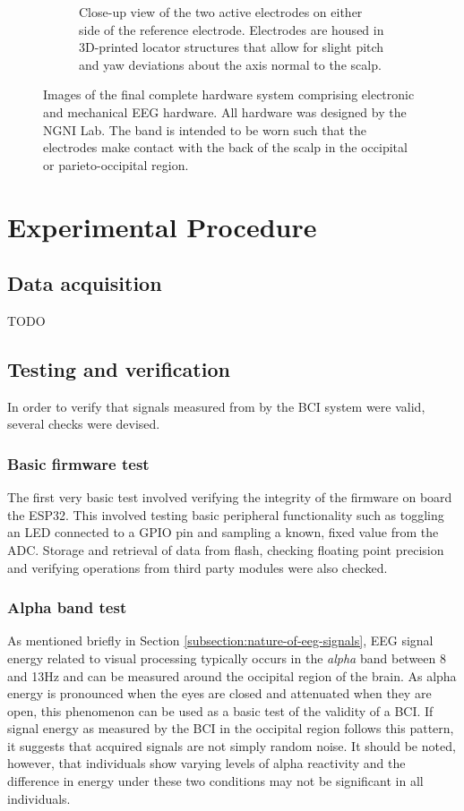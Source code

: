 \begin{figure}
\begin{subfigure}[c]{0.48\textwidth}
         \caption{Close-up view of the two active electrodes on either side of the reference electrode. Electrodes are housed in 3D-printed locator structures that allow for slight pitch and yaw deviations about the axis normal to the scalp.}
         \label{fig:final-headband-electrodes}
     \end{subfigure}
        \caption{Images of the final complete hardware system comprising electronic and mechanical EEG hardware. All hardware was designed by the NGNI Lab. The band is intended to be worn such that the electrodes make contact with the back of the scalp in the occipital or parieto-occipital region.}
        \label{fig:final-headband-subfigs}
\end{figure}

\section{Experimental Procedure}
\subsection{Data acquisition}
TODO

\subsection{Testing and verification}
In order to verify that signals measured from by the BCI system were valid, several checks were devised. 

\subsubsection{Basic firmware test}
The first very basic test involved verifying the integrity of the firmware on board the ESP32. This involved testing basic peripheral functionality such as toggling an LED connected to a GPIO pin and sampling a known, fixed value from the ADC. Storage and retrieval of data from flash, checking floating point precision and verifying operations from third party modules were also checked. 

\subsubsection{Alpha band test}
As mentioned briefly in Section \ref{subsection:nature-of-eeg-signals}, EEG signal energy related to visual processing typically occurs in the \textit{alpha} band between 8 and 13Hz and can be measured around the occipital region of the brain. As alpha energy is pronounced when the eyes are closed and attenuated when they are open, this phenomenon can be used as a basic test of the validity of a BCI. If signal energy as measured by the BCI in the occipital region follows this pattern, it suggests that acquired signals are not simply random noise. It should be noted, however, that individuals show varying levels of alpha reactivity and the difference in energy under these two conditions may not be significant in all individuals. 

